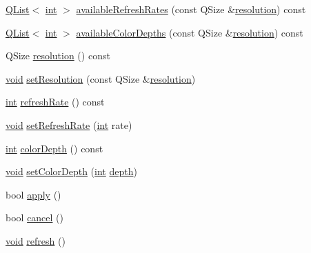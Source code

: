 \begin{DoxyCompactItemize}
\item 
\hyperlink{class_q_list}{Q\-List}$<$ \hyperlink{ioapi_8h_a787fa3cf048117ba7123753c1e74fcd6}{int} $>$ \hyperlink{class_qxt_screen_a655ab7c5e684da9be97842493c22b07d}{available\-Refresh\-Rates} (const Q\-Size \&\hyperlink{class_qxt_screen_a7b544307caab8614cc702953a41335ee}{resolution}) const 
\item 
\hyperlink{class_q_list}{Q\-List}$<$ \hyperlink{ioapi_8h_a787fa3cf048117ba7123753c1e74fcd6}{int} $>$ \hyperlink{class_qxt_screen_ade698221873726edb7dc3f02028c42bb}{available\-Color\-Depths} (const Q\-Size \&\hyperlink{class_qxt_screen_a7b544307caab8614cc702953a41335ee}{resolution}) const 
\item 
Q\-Size \hyperlink{class_qxt_screen_a7b544307caab8614cc702953a41335ee}{resolution} () const 
\item 
\hyperlink{group___u_a_v_objects_plugin_ga444cf2ff3f0ecbe028adce838d373f5c}{void} \hyperlink{class_qxt_screen_a3306c14acb858fce1c51db2c7cc2231c}{set\-Resolution} (const Q\-Size \&\hyperlink{class_qxt_screen_a7b544307caab8614cc702953a41335ee}{resolution})
\item 
\hyperlink{ioapi_8h_a787fa3cf048117ba7123753c1e74fcd6}{int} \hyperlink{class_qxt_screen_a38277e35064b3ff3297983d7db567a42}{refresh\-Rate} () const 
\item 
\hyperlink{group___u_a_v_objects_plugin_ga444cf2ff3f0ecbe028adce838d373f5c}{void} \hyperlink{class_qxt_screen_af2fc11cab3ccfe2c2b256864fc9569c2}{set\-Refresh\-Rate} (\hyperlink{ioapi_8h_a787fa3cf048117ba7123753c1e74fcd6}{int} rate)
\item 
\hyperlink{ioapi_8h_a787fa3cf048117ba7123753c1e74fcd6}{int} \hyperlink{class_qxt_screen_ad025fbb141ba2a6c83f01cc8c946bce4}{color\-Depth} () const 
\item 
\hyperlink{group___u_a_v_objects_plugin_ga444cf2ff3f0ecbe028adce838d373f5c}{void} \hyperlink{class_qxt_screen_a625ceb22845d94dc27f3a368ceb3e0bb}{set\-Color\-Depth} (\hyperlink{ioapi_8h_a787fa3cf048117ba7123753c1e74fcd6}{int} \hyperlink{glext_8h_ab9dbe6fd459e0977873d5bfe29cec173}{depth})
\item 
bool \hyperlink{class_qxt_screen_a721e2fa041105bb069b44113ea9aa4d7}{apply} ()
\item 
bool \hyperlink{class_qxt_screen_a1e449bf2f9f2ce6d1d0c8ae77c75e3b9}{cancel} ()
\item 
\hyperlink{group___u_a_v_objects_plugin_ga444cf2ff3f0ecbe028adce838d373f5c}{void} \hyperlink{class_qxt_screen_a9a939aa2649c9525509e1bc5393e934f}{refresh} ()
\end{DoxyCompactItemize}



